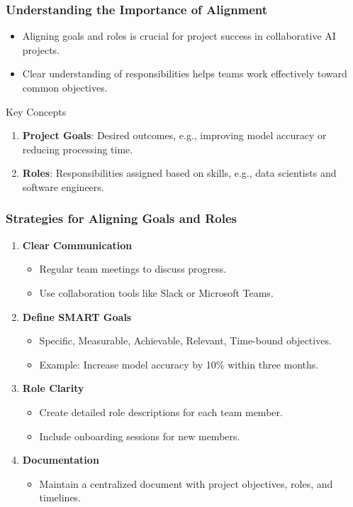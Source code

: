 \documentclass[aspectratio=169]{beamer}
\begin{document}
\begin{frame}[fragile]
    \frametitle{Understanding the Importance of Alignment}
    \begin{itemize}
        \item Aligning goals and roles is crucial for project success in collaborative AI projects.
        \item Clear understanding of responsibilities helps teams work effectively toward common objectives.
    \end{itemize}
    
    \begin{block}{Key Concepts}
        \begin{enumerate}
            \item \textbf{Project Goals}: Desired outcomes, e.g., improving model accuracy or reducing processing time.
            \item \textbf{Roles}: Responsibilities assigned based on skills, e.g., data scientists and software engineers.
        \end{enumerate}
    \end{block}
\end{frame}

\begin{frame}[fragile]
    \frametitle{Strategies for Aligning Goals and Roles}
    \begin{enumerate}
        \item \textbf{Clear Communication}
            \begin{itemize}
                \item Regular team meetings to discuss progress.
                \item Use collaboration tools like Slack or Microsoft Teams.
            \end{itemize}
        \item \textbf{Define SMART Goals}
            \begin{itemize}
                \item Specific, Measurable, Achievable, Relevant, Time-bound objectives.
                \item Example: Increase model accuracy by 10\% within three months.
            \end{itemize}
        \item \textbf{Role Clarity}
            \begin{itemize}
                \item Create detailed role descriptions for each team member.
                \item Include onboarding sessions for new members.
            \end{itemize}
        \item \textbf{Documentation}
            \begin{itemize}
                \item Maintain a centralized document with project objectives, roles, and timelines.
            \end{itemize}
    \end{enumerate}
\end{frame}
\end{document}

